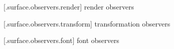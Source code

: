 %	

 [\iotwod.surface.observers.render] { render observers}

%	

 [\iotwod.surface.observers.transform] { transformation observers}

%	

 [\iotwod.surface.observers.font] { font observers}

%	
